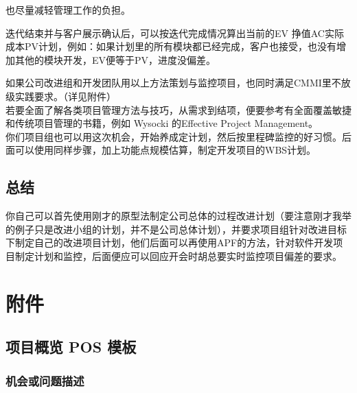 也尽量减轻管理工作的负担。

迭代结束并与客户展示确认后，可以按迭代完成情况算出当前的EV
挣值AC实际成本PV计划，例如：如果计划里的所有模块都已经完成，客户也接受，也没有增加其他的模块开发，EV便等于PV，进度没偏差。

如果公司改进组和开发团队用以上方法策划与监控项目，也同时满足CMMI里不放级实践要求。（详见附件）\\

若要全面了解各类项目管理方法与技巧，从需求到结项，便要参考有全面覆盖敏捷和传统项目管理的书籍，例如 Wysocki 的Effective Project Management。\\


你们项目组也可以用这次机会，开始养成定计划，然后按里程碑监控的好习惯。后面可以使用同样步骤，加上功能点规模估算，制定开发项目的WBS计划。\\

\hypertarget{ux603bux7ed3}{%
\subsection{总结}\label{ux603bux7ed3}}

你自己可以首先使用刚才的原型法制定公司总体的过程改进计划（要注意刚才我举的例子只是改进小组的计划，并不是公司总体计划），并要求项目组针对改进目标下制定自己的改进项目计划，他们后面可以再使用APF的方法，针对软件开发项目制定计划和监控，后面便应可以回应开会时胡总要实时监控项目偏差的要求。

\hypertarget{ux9644ux4ef6}{%
\section{附件}\label{ux9644ux4ef6}}

\hypertarget{ux9879ux76eeux4e00ux9875ux6982ux89c8-pos}{%
\subsection{项目概览 POS 模板}\label{ux9879ux76eeux4e00ux9875ux6982ux89c8-pos}}

\hypertarget{ux673aux4f1aux6216ux95eeux9898ux63cfux8ff0}{%
\subsubsection{机会或问题描述}\label{ux673aux4f1aux6216ux95eeux9898ux63cfux8ff0}}

